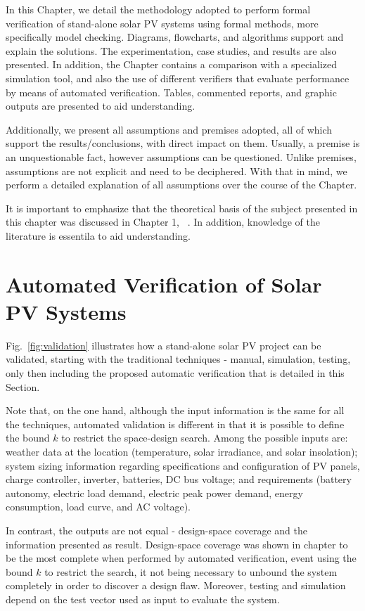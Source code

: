 In this Chapter, we detail the methodology adopted to perform formal verification of stand-alone solar PV systems using formal methods, more specifically model checking. Diagrams, flowcharts, and algorithms support and explain the solutions. The experimentation, case studies, and results are also presented. In addition, the Chapter contains a comparison with a specialized simulation tool, and also the use of different verifiers that evaluate performance by means of automated verification. Tables, commented reports, and graphic outputs are presented to aid  understanding.

Additionally, we present all assumptions and premises adopted, all of which support the results/conclusions, with direct impact on them. Usually, a premise is an unquestionable fact, however assumptions can be questioned. Unlike premises, assumptions are not explicit and need to be deciphered. With that in mind, we perform a detailed explanation of all assumptions over the course of the Chapter.

It is important to emphasize that the theoretical basis of the subject presented in this chapter was discussed in Chapter 1, ~. In addition, knowledge of the literature is essentila to aid understanding.


\section{Automated Verification of Solar PV Systems}

Fig.~\ref{fig:validation} illustrates how a stand-alone solar PV project can be validated, starting with the traditional techniques - manual, simulation, testing, only then including the proposed automatic verification that is detailed in this Section. 

Note that, on the one hand, although the input information is the same for all the techniques, automated validation is different in that it is possible to define the bound $k$ to restrict the space-design search. Among the possible inputs are: weather data at the location (temperature, solar irradiance, and solar insolation); system sizing information regarding specifications and configuration of PV panels, charge controller, inverter, batteries, DC bus  voltage; and requirements (battery autonomy, electric load demand, electric peak power demand, energy consumption, load curve, and AC voltage).

In contrast, the outputs are not equal - design-space coverage and the information presented as result. Design-space coverage was shown in chapter  to be the most complete when performed by automated verification, event using the bound $k$ to restrict the search, it not being necessary to unbound the system completely in order to discover a design flaw. Moreover, testing and simulation depend on the test vector used as input to evaluate the system.

